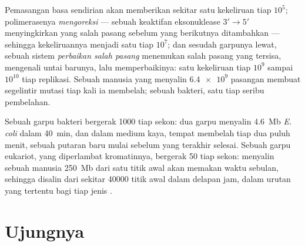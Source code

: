 \begin{proposition}[Kesetiaan]\label{prop:b1:replication-mitosis:fidelity}
Pemasangan basa sendirian akan memberikan sekitar satu kekeliruan tiap
$10^5$; polimerasenya \emph{mengoreksi} --- sebuah keaktifan
eksonuklease $3' \to 5'$ menyingkirkan  yang salah pasang
sebelum yang berikutnya ditambahkan --- sehingga kekeliruannya menjadi
satu tiap $10^7$; dan sesudah garpunya lewat, sebuah sistem
\emph{perbaikan salah pasang} menemukan salah pasang yang tersisa,
mengenali untai barunya, lalu memperbaikinya: satu kekeliruan tiap
$10^9$ sampai $10^{10}$  tiap replikasi. Sebuah  manusia
yang menyalin $\num{6.4e9}$ pasangan membuat segelintir mutasi tiap kali
ia membelah; sebuah bakteri, satu tiap seribu pembelahan.
\end{proposition}

\begin{example}\label{ex:b1:replication-mitosis:speed}
Sebuah garpu bakteri bergerak \qty{1000}{}  tiap sekon: dua
garpu menyalin \qty{4.6}{Mb} \emph{E. coli} dalam \qty{40}{min}, dan
dalam medium kaya, tempat  membelah tiap dua puluh menit, sebuah
putaran baru mulai sebelum yang terakhir selesai. Sebuah garpu eukariot,
yang diperlambat kromatinnya, bergerak \qty{50}{} tiap sekon: menyalin
sebuah  manusia \qty{250}{Mb} dari satu titik awal akan memakan
waktu sebulan, sehingga  disalin dari sekitar \num{40000} titik
awal dalam delapan jam, dalam urutan yang tertentu bagi tiap jenis
.
\end{example}

\section{Ujungnya}

